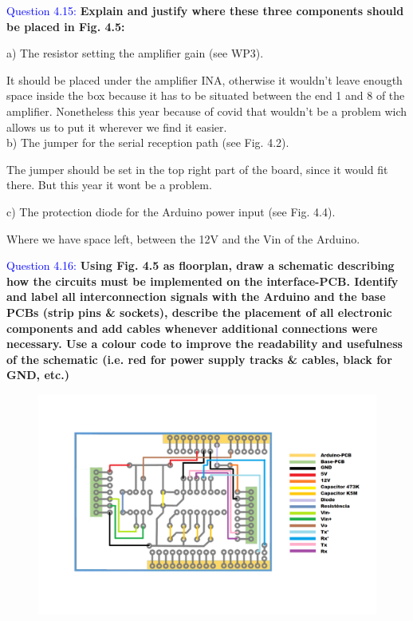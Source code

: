 \documentclass[12pt, a4papre]{article}
\begin{document}
	\textcolor{blue}{Question 4.15:} \textbf{Explain and justify where these three components should be placed in Fig. 4.5: }
	
	a)  The resistor setting the amplifier gain (see WP3).
	
	It should be placed under the amplifier INA, otherwise it wouldn't leave enougth space inside the box because it has to be situated between the end 1 and 8 of the amplifier. Nonetheless this year because of covid that wouldn't be a problem wich allows us to put it wherever we find it easier.\\
	
	b)  The jumper for the serial reception path (see Fig. 4.2).
	
	The jumper should be set in the top right part of the board, since it would fit there. But this year it wont be a problem.
	
	c)  The protection diode for the Arduino power input (see Fig. 4.4).
	
	Where we have space left, between the 12V and the Vin of the Arduino.
	
	

	\textcolor{blue}{Question 4.16:} \textbf{Using Fig. 4.5 as floorplan, draw a schematic describing how the circuits must be implemented on the interface-PCB. Identify and label all interconnection signals with the Arduino and the base PCBs (strip pins \& sockets), describe the placement of all electronic components and add cables whenever additional connections were necessary. Use a colour code to improve the readability and usefulness of the schematic (i.e. red for power supply tracks \& cables, black for GND, etc.)}
	
	\begin{figure}[H]
		\begin{center}
		\includegraphics[width=140mm]{placa1_entic.png}
		\end{center}
	\end{figure}
	
\end{document}
